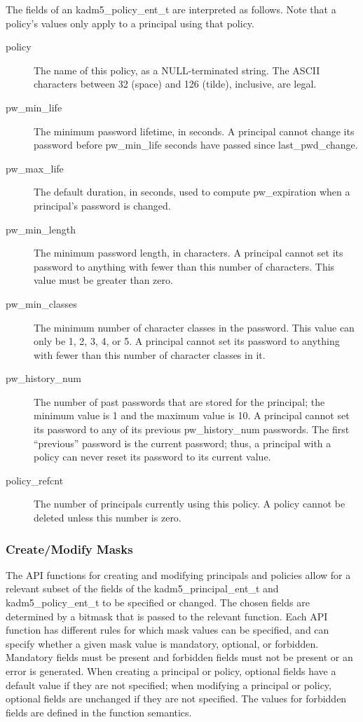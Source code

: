 The fields of an kadm5_policy_ent_t are interpreted as follows.
Note that a policy's values only apply to a principal using that
policy.

\begin{description}
\item[policy] The name of this policy, as a NULL-terminated string.
The ASCII characters between 32 (space) and 126 (tilde), inclusive,
are legal.

\item[pw_min_life] The minimum password lifetime, in seconds.
A principal cannot change its password before pw_min_life seconds have
passed since last_pwd_change.

\item[pw_max_life] The default duration, in seconds, used to compute
pw_expiration when a principal's password is changed.

\item[pw_min_length] The minimum password length, in characters.  A
principal cannot set its password to anything with fewer than this
number of characters.  This value must be greater than zero.

\item[pw_min_classes] The minimum number of character classes in the
password.  This value can only be 1, 2, 3, 4, or 5.  A principal cannot
set its password to anything with fewer than this number of character
classes in it.

\item[pw_history_num] The number of past passwords that are
stored for the principal; the minimum value is 1 and the maximum value
is 10.  A principal cannot set its password to any of its previous
pw_history_num passwords.  The first ``previous'' password is the
current password; thus, a principal with a policy can never reset its
password to its current value.

\item[policy_refcnt]  The number of principals currently using this policy.
A policy cannot be deleted unless this number is zero.
\end{description}

\subsubsection{Create/Modify Masks}
\label{sec:masks}

The API functions for creating and modifying principals and policies
allow for a relevant subset of the fields of the
kadm5_principal_ent_t and kadm5_policy_ent_t to be specified
or changed.  The chosen fields are determined by a bitmask that is
passed to the relevant function.  Each API function has different
rules for which mask values can be specified, and can specify whether
a given mask value is mandatory, optional, or forbidden.  Mandatory
fields must be present and forbidden fields must not be present or an
error is generated.  When creating a principal or policy, optional
fields have a default value if they are not specified; when modifying
a principal or policy, optional fields are unchanged if they are not
specified.  The values for forbidden fields are defined in the
function semantics.

